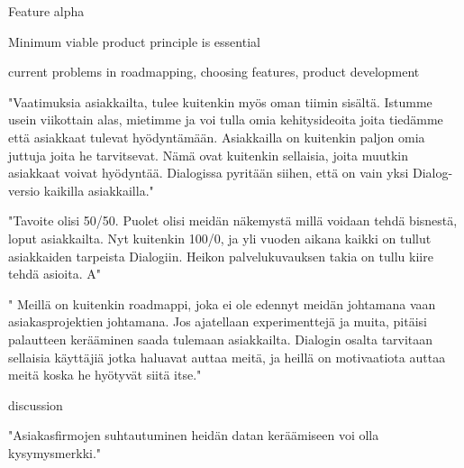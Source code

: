 \documentclass[english]{tktltiki2}
\theoremstyle{definition}
\theoremstyle{remark}
\begin{document}
Feature alpha \cite{bosch2012building}

Minimum viable product principle is essential 

current problems in roadmapping, choosing features, product development


"Vaatimuksia asiakkailta, tulee kuitenkin myös oman tiimin sisältä. Istumme usein viikottain alas, mietimme ja voi tulla omia kehitysideoita joita tiedämme että asiakkaat tulevat hyödyntämään. Asiakkailla on kuitenkin paljon omia juttuja joita he tarvitsevat. Nämä ovat kuitenkin sellaisia, joita muutkin asiakkaat voivat hyödyntää. Dialogissa pyritään siihen, että on vain yksi Dialog-versio kaikilla asiakkailla."

"Tavoite olisi 50/50. Puolet olisi meidän näkemystä millä voidaan tehdä bisnestä, loput asiakkailta. Nyt kuitenkin 100/0, ja yli vuoden aikana kaikki on tullut asiakkaiden tarpeista Dialogiin. Heikon palvelukuvauksen takia on tullu kiire tehdä asioita. A"

" Meillä on kuitenkin roadmappi, joka ei ole edennyt meidän johtamana vaan asiakasprojektien johtamana. Jos ajatellaan experimenttejä ja muita, pitäisi palautteen kerääminen saada tulemaan asiakkailta.  Dialogin osalta tarvitaan sellaisia käyttäjiä jotka haluavat auttaa meitä, ja heillä on motivaatiota auttaa meitä koska he hyötyvät siitä itse."



discussion


"Asiakasfirmojen suhtautuminen heidän datan keräämiseen voi olla kysymysmerkki."
\end{document}
